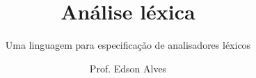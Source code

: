 \title{Análise léxica}
\subtitle{Uma linguagem para especificação de analisadores léxicos}
\date{}
\author{Prof. Edson Alves}
